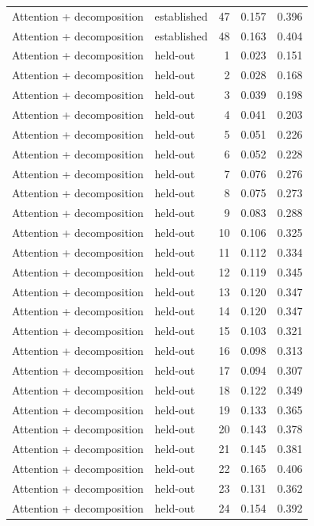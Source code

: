 \begin{tabular}{llrrr}
Attention + decomposition & established & 47 & 0.157 & 0.396 \\
Attention + decomposition & established & 48 & 0.163 & 0.404 \\
Attention + decomposition & held-out & 1 & 0.023 & 0.151 \\
Attention + decomposition & held-out & 2 & 0.028 & 0.168 \\
Attention + decomposition & held-out & 3 & 0.039 & 0.198 \\
Attention + decomposition & held-out & 4 & 0.041 & 0.203 \\
Attention + decomposition & held-out & 5 & 0.051 & 0.226 \\
Attention + decomposition & held-out & 6 & 0.052 & 0.228 \\
Attention + decomposition & held-out & 7 & 0.076 & 0.276 \\
Attention + decomposition & held-out & 8 & 0.075 & 0.273 \\
Attention + decomposition & held-out & 9 & 0.083 & 0.288 \\
Attention + decomposition & held-out & 10 & 0.106 & 0.325 \\
Attention + decomposition & held-out & 11 & 0.112 & 0.334 \\
Attention + decomposition & held-out & 12 & 0.119 & 0.345 \\
Attention + decomposition & held-out & 13 & 0.120 & 0.347 \\
Attention + decomposition & held-out & 14 & 0.120 & 0.347 \\
Attention + decomposition & held-out & 15 & 0.103 & 0.321 \\
Attention + decomposition & held-out & 16 & 0.098 & 0.313 \\
Attention + decomposition & held-out & 17 & 0.094 & 0.307 \\
Attention + decomposition & held-out & 18 & 0.122 & 0.349 \\
Attention + decomposition & held-out & 19 & 0.133 & 0.365 \\
Attention + decomposition & held-out & 20 & 0.143 & 0.378 \\
Attention + decomposition & held-out & 21 & 0.145 & 0.381 \\
Attention + decomposition & held-out & 22 & 0.165 & 0.406 \\
Attention + decomposition & held-out & 23 & 0.131 & 0.362 \\
Attention + decomposition & held-out & 24 & 0.154 & 0.392 \\

\end{tabular}
